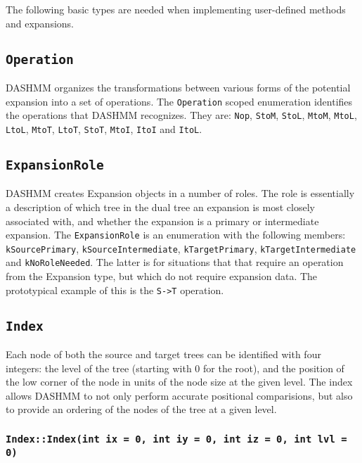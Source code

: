 The following basic types are needed when implementing user-defined methods and
expansions.

\subsection{\texttt{Operation}}

DASHMM organizes the transformations between various forms of the potential
expansion into a set of operations. The \texttt{Operation} scoped enumeration
identifies the operations that DASHMM recognizes. They are: \texttt{Nop},
\texttt{StoM}, \texttt{StoL}, \texttt{MtoM}, \texttt{MtoL}, \texttt{LtoL},
\texttt{MtoT}, \texttt{LtoT}, \texttt{StoT}, \texttt{MtoI}, \texttt{ItoI}
and \texttt{ItoL}.

\subsection{\texttt{ExpansionRole}}

DASHMM creates Expansion objects in a number of roles. The role is essentially
a description of which tree in the dual tree an expansion is most closely
associated with, and whether the expansion is a primary or intermediate
expansion.  The \texttt{ExpansionRole} is an enumeration with the following
members: \texttt{kSourcePrimary}, \texttt{kSourceIntermediate},
\texttt{kTargetPrimary}, \texttt{kTargetIntermediate} and
\texttt{kNoRoleNeeded}. The latter is for situations that that require an
operation from the Expansion type, but which do not require expansion data.
The prototypical example of this is the \texttt{S->T} operation.

\subsection{\texttt{Index}}

Each node of both the source and target trees can be identified with four
integers: the level of the tree (starting with 0 for the root), and the
position of the low corner of the node in units of the node size at the given
level. The index allows DASHMM to not only perform accurate positional
comparisions, but also to provide an ordering of the nodes of the tree at a
given level.

\subsubsection{\texttt{Index::Index(int ix = 0, int iy = 0, int iz = 0, int lvl = 0)}}

